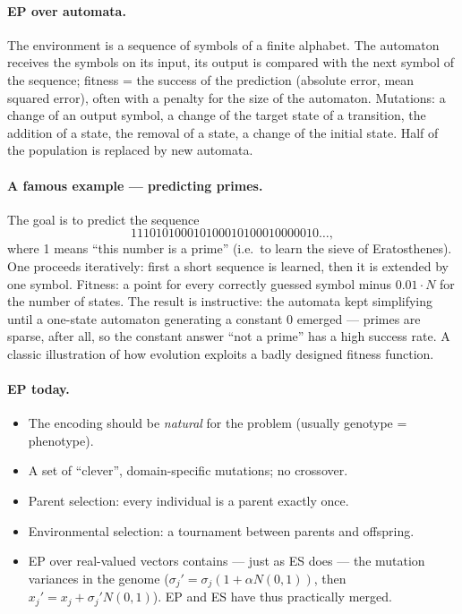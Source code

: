 \documentclass[11pt,a4paper]{article}
\theoremstyle{definition}
\providecommand{\uv}[1]{``#1''}
\begin{document}
\paragraph{EP over automata.} The environment is a sequence of symbols of a
finite alphabet. The automaton receives the symbols on its input, its output is
compared with the next symbol of the sequence; fitness = the success of the
prediction (absolute error, mean squared error), often with a penalty for the
size of the automaton. Mutations: a change of an output symbol, a change of the
target state of a transition, the addition of a state, the removal of a state, a
change of the initial state. Half of the population is replaced by new automata.

\paragraph{A famous example --- predicting primes.} The goal is to predict the
sequence
\[
111010100010100010100010000010\ldots,
\]
where 1 means \uv{this number is a prime} (i.e.\ to learn the sieve of
Eratosthenes). One proceeds iteratively: first a short sequence is learned, then
it is extended by one symbol. Fitness: a point for every correctly guessed
symbol minus $0.01 \cdot N$ for the number of states. The result is instructive:
the automata kept simplifying until a one-state automaton generating a constant
0 emerged --- primes are sparse, after all, so the constant answer \uv{not a
prime} has a high success rate. A classic illustration of how evolution exploits
a badly designed fitness function.

\paragraph{EP today.}
\begin{itemize}
\item The encoding should be \emph{natural} for the problem (usually genotype =
  phenotype).
\item A set of \uv{clever}, domain-specific mutations; no crossover.
\item Parent selection: every individual is a parent exactly once.
\item Environmental selection: a tournament between parents and offspring.
\item EP over real-valued vectors contains --- just as ES does --- the mutation
  variances in the genome ($\sigma_j' = \sigma_j(1 + \alpha N(0,1))$, then
  $x_j' = x_j + \sigma_j' N(0,1)$). EP and ES have thus practically merged.
\end{itemize}
\end{document}
